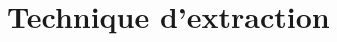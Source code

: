 \documentclass[a4paper,12pt]{article}
\begin{document}








% 

\printbibliography
\clearpage


\appendix


\section{Technique d'extraction}

\end{document}
